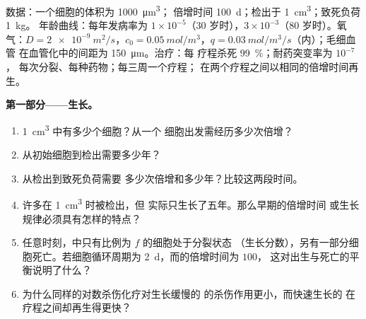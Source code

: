 \begin{problem}
\label{pb:b3:cancer-biology:1}
数据：一个细胞的体积为 \qty{1000}{\micro m^3}；
倍增时间 \qty{100}{d}；检出于 \qty{1}{cm^3}；致死负荷 \qty{1}{kg}。
年龄曲线：每年发病率为 $1\times 10^{-5}$（$30$ 岁时），$3\times
10^{-3}$（$80$ 岁时）。氧气：$D = \qty{2e-9}{m^2/s}$，$c_{0} =
\qty{0.05}{mol/m^3}$，$q = \qty{0.03}{mol/m^3/s}$（内）；毛细血管
在血管化中的间距为 \qty{150}{\micro m}。治疗：每
疗程杀死 \qty{99}{\%}；耐药突变率为 $10^{-7}$，
每次分裂、每种药物；每三周一个疗程；
在两个疗程之间以相同的倍增时间再生。

\medskip
\noindent\textbf{第一部分——生长。}
\begin{enumerate}
  \item \qty{1}{cm^3} 中有多少个细胞？从一个
        细胞出发需经历多少次倍增？
  \item 从初始细胞到检出需要多少年？
  \item 从检出到致死负荷需要
        多少次倍增和多少年？比较这两段时间。
  \item 许多在 \qty{1}{cm^3} 时被检出，但
        实际只生长了五年。那么早期的倍增时间
        或生长规律必须具有怎样的特点？
  \item 任意时刻，中只有比例为 $f$ 的细胞处于分裂状态
        （生长分数），另有一部分细胞死亡。若细胞循环周期为
        \qty{2}{d}，而的倍增时间为 $100$，
        这对出生与死亡的平衡说明了什么？
  \item 为什么同样的对数杀伤化疗对生长缓慢的
        的杀伤作用更小，而快速生长的
        在疗程之间却再生得更快？
\end{enumerate}


\end{problem}
